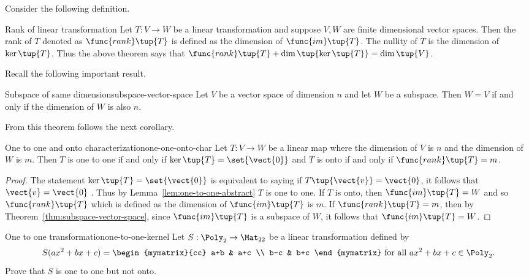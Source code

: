 Consider the following definition. 

\begin{definition}{Rank of linear transformation}{}
Let $T:V\rightarrow W$ be a linear transformation and suppose $V,W$ are finite dimensional vector spaces. Then
the rank of $T$ denoted as $\func{rank}\tup{T} $ is defined as the
dimension of $\func{im}\tup{T}$. The nullity of $T$ is the
dimension of $\ker \tup{T}$. Thus the above theorem says that $
\func{rank}\tup{T} +\dim \tup{\ker \tup{T} } =\dim
\tup{V}$.
\end{definition}

Recall the following important result. 

\begin{theorem}{Subspace of same dimension}{subspace-vector-space}
Let $V$ be a vector space of dimension $n$ and let $W$ be a
subspace. Then $W=V$ if and only if the dimension of $W$ is also $n$.
\end{theorem}

From this theorem follows the next corollary.

\begin{corollary}{One to one and onto characterization}{one-one-onto-char}
Let $T:V\rightarrow W$ be a linear map where the dimension of $V$ is $n$ and
the dimension of $W$ is $m$. Then $T$ is one to one if and only if $\ker
\tup{T} =\set{\vect{0}} $ and $T$ is onto if and only if $
\func{rank}\tup{T} =m$.
\end{corollary}

\begin{proof}
The statement $\ker \tup{T } =\set{\vect{0}} $
is equivalent to saying if $T \tup{\vect{v} }=\vect{0}$, it follows that $\vect{v}=\vect{0}$
. Thus by Lemma~\ref{lem:one-to-one-abstract} $T$ is one to one. If $T$ is onto, then $
\func{im}\tup{T} =W$ and so $\func{rank}\tup{T} $ which is
defined as the dimension of $\func{im}\tup{T} $ is $m$. If $\func{
rank}\tup{T} =m$, then by Theorem~\ref{thm:subspace-vector-space}, since $\func{im}
\tup{T} $ is a subspace of $W$, it follows that $\func{im}\tup{
T} =W$. 
\end{proof}

\begin{example}{One to one transformation}{one-to-one-kernel}
Let $S:\Poly_2\to\Mat_{22}$ be a linear transformation
defined by
\[ S(ax^2+bx+c)
=
\begin{mymatrix}{cc}
a+b & a+c \\ b-c & b+c \end{mymatrix}
\mbox{ for all }
 ax^2+bx+c\in \Poly_2.\]
Prove that $S$ is one to one but not onto.
\end{example}

